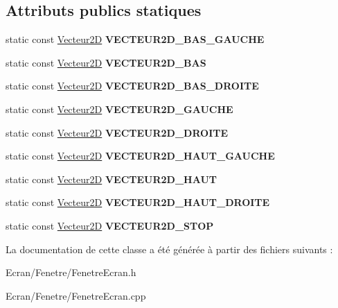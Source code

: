 \subsection*{Attributs publics statiques}
\begin{DoxyCompactItemize}
\item 
\mbox{\label{class_fenetre_ecran_a65606b93774c9804d479542d6deb4602}} 
static const \mbox{\hyperlink{class_vecteur2_d}{Vecteur2D}} {\bfseries V\+E\+C\+T\+E\+U\+R2\+D\+\_\+\+B\+A\+S\+\_\+\+G\+A\+U\+C\+HE}
\item 
\mbox{\label{class_fenetre_ecran_a0a2db34ee78a321af5437c0e66f2294f}} 
static const \mbox{\hyperlink{class_vecteur2_d}{Vecteur2D}} {\bfseries V\+E\+C\+T\+E\+U\+R2\+D\+\_\+\+B\+AS}
\item 
\mbox{\label{class_fenetre_ecran_a3d10902919449d9c84ae247a39dcc734}} 
static const \mbox{\hyperlink{class_vecteur2_d}{Vecteur2D}} {\bfseries V\+E\+C\+T\+E\+U\+R2\+D\+\_\+\+B\+A\+S\+\_\+\+D\+R\+O\+I\+TE}
\item 
\mbox{\label{class_fenetre_ecran_abac7e05d73341076b739350c034a6175}} 
static const \mbox{\hyperlink{class_vecteur2_d}{Vecteur2D}} {\bfseries V\+E\+C\+T\+E\+U\+R2\+D\+\_\+\+G\+A\+U\+C\+HE}
\item 
\mbox{\label{class_fenetre_ecran_a9b0f38ad36e92cb3cd506689998c79c4}} 
static const \mbox{\hyperlink{class_vecteur2_d}{Vecteur2D}} {\bfseries V\+E\+C\+T\+E\+U\+R2\+D\+\_\+\+D\+R\+O\+I\+TE}
\item 
\mbox{\label{class_fenetre_ecran_a99efd95a288a32a9e137555b97453bfc}} 
static const \mbox{\hyperlink{class_vecteur2_d}{Vecteur2D}} {\bfseries V\+E\+C\+T\+E\+U\+R2\+D\+\_\+\+H\+A\+U\+T\+\_\+\+G\+A\+U\+C\+HE}
\item 
\mbox{\label{class_fenetre_ecran_a92c0ace12c265fdaa7f82bd83e09267f}} 
static const \mbox{\hyperlink{class_vecteur2_d}{Vecteur2D}} {\bfseries V\+E\+C\+T\+E\+U\+R2\+D\+\_\+\+H\+A\+UT}
\item 
\mbox{\label{class_fenetre_ecran_a48eb96828b6329d62a81c8b047397126}} 
static const \mbox{\hyperlink{class_vecteur2_d}{Vecteur2D}} {\bfseries V\+E\+C\+T\+E\+U\+R2\+D\+\_\+\+H\+A\+U\+T\+\_\+\+D\+R\+O\+I\+TE}
\item 
\mbox{\label{class_fenetre_ecran_a212c8828047083a0eae5e0a8275ddc9d}} 
static const \mbox{\hyperlink{class_vecteur2_d}{Vecteur2D}} {\bfseries V\+E\+C\+T\+E\+U\+R2\+D\+\_\+\+S\+T\+OP}
\end{DoxyCompactItemize}


La documentation de cette classe a été générée à partir des fichiers suivants \+:\begin{DoxyCompactItemize}
\item 
Ecran/\+Fenetre/Fenetre\+Ecran.\+h\item 
Ecran/\+Fenetre/Fenetre\+Ecran.\+cpp\end{DoxyCompactItemize}
